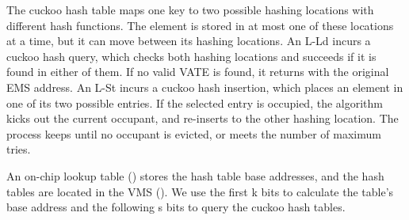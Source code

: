 \ifx\undefined\stale
The cuckoo hash table maps one key to two possible hashing locations with different hash functions. The element is stored in at most one of these locations at a time, but it can move between its hashing locations. An L-Ld incurs a cuckoo hash query, which checks both hashing locations and succeeds if it is found in either of them. If no valid VATE is found, it returns with the original EMS address.
An L-St incurs a cuckoo hash insertion, which places an element in one of its two possible entries. If the selected entry is occupied, the algorithm kicks out the current occupant, and re-inserts to the other hashing location. The process keeps until no occupant is evicted, or meets the number of maximum tries. 
\fi

An on-chip lookup table (\oone) stores the hash table base addresses, and the hash tables are located in the VMS (\ttwo). We use the first k bits to calculate the table's base address and the following s bits to query the cuckoo hash tables. 
